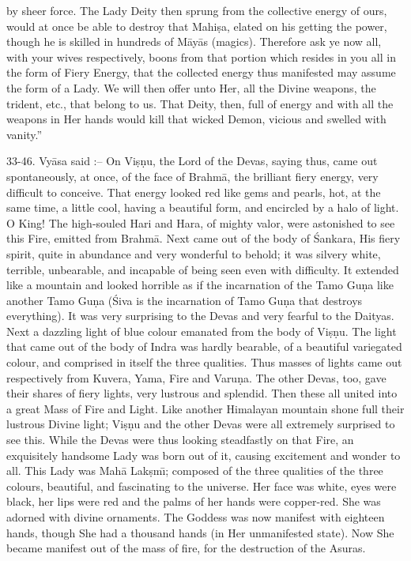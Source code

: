 by sheer force. The Lady Deity then sprung from the collective energy of ours, would at once be able to destroy that Mahi\d{s}a, elated on his getting the power, though he is skilled in hundreds of M\=ay\=as (magics). Therefore ask ye now all, with your wives respectively, boons from that portion which resides in you all in the form of Fiery Energy, that the collected energy thus manifested may assume the form of a Lady. We will then offer unto Her, all the Divine weapons, the trident, etc., that belong to us. That Deity, then, full of energy and with all the weapons in Her hands would kill that wicked Demon, vicious and swelled with vanity.''

33-46. Vy\=asa said :-- On Vi\d{s}\d{n}u, the Lord of the Devas, saying thus, came out spontaneously, at once, of the face of Brahm\=a, the brilliant fiery energy, very difficult to conceive. That energy looked red like gems and pearls, hot, at the same time, a little cool, having a beautiful form, and encircled by a halo of light. O King! The high-souled Hari and Hara, of mighty valor, were astonished to see this Fire, emitted from Brahm\=a. Next came out of the body of \'Sankara, His fiery spirit, quite in abundance and very wonderful to behold; it was silvery white, terrible, unbearable, and incapable of being seen even with difficulty. It extended like a mountain and looked horrible as if the incarnation of the Tamo Gu\d{n}a like another Tamo Gu\d{n}a (\'Siva is the incarnation of Tamo Gu\d{n}a that destroys everything). It was very surprising to the Devas and very fearful to the Daityas. Next a dazzling light of blue colour emanated from the body of Vi\d{s}\d{n}u. The light that came out of the body of Indra was hardly bearable, of a beautiful variegated colour, and comprised in itself the three qualities. Thus masses of lights came out respectively from Kuvera, Yama, Fire and Varu\d{n}a. The other Devas, too, gave their shares of fiery lights, very lustrous and splendid. Then these all united into a great Mass of Fire and Light. Like another Himalayan mountain shone full their lustrous Divine light; Vi\d{s}\d{n}u and the other Devas were all extremely surprised to see this. While the Devas were thus looking steadfastly on that Fire, an exquisitely handsome Lady was born out of it, causing excitement and wonder to all. This Lady was Mah\=a Lak\d{s}m\={\i}; composed of the three qualities of the three colours, beautiful, and fascinating to the universe. Her face was white, eyes were black, her lips were red and the palms of her hands were copper-red. She was adorned with divine ornaments. The Goddess was now manifest with eighteen hands, though She had a thousand hands (in Her unmanifested state). Now She became manifest out of the mass of fire, for the destruction of the Asuras.

